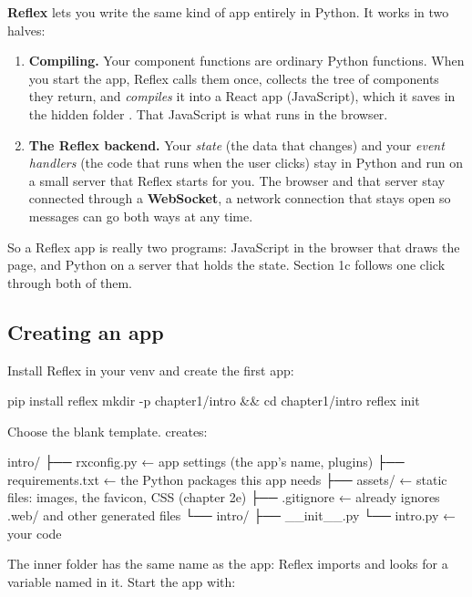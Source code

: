 \textbf{Reflex} lets you write the same kind of app entirely in Python. It works in two halves:

\begin{enumerate}
\item \textbf{Compiling.} Your component functions are ordinary Python functions. When you start the app, Reflex calls them once, collects the tree of components they return, and \emph{compiles} it into a React app (JavaScript), which it saves in the hidden folder . That JavaScript is what runs in the browser.
\item \textbf{The Reflex backend.} Your \emph{state} (the data that changes) and your \emph{event handlers} (the code that runs when the user clicks) stay in Python and run on a small server that Reflex starts for you. The browser and that server stay connected through a \textbf{WebSocket}, a network connection that stays open so messages can go both ways at any time.
\end{enumerate}

So a Reflex app is really two programs: JavaScript in the browser that draws the page, and Python on a server that holds the state. Section 1c follows one click through both of them.

\subsection{Creating an app}

Install Reflex in your venv and create the first app:

\begin{code}
pip install reflex
mkdir -p chapter1/intro && cd chapter1/intro
reflex init
\end{code}

Choose the blank template.  creates:

\begin{code}
intro/
├── rxconfig.py        ← app settings (the app's name, plugins)
├── requirements.txt   ← the Python packages this app needs
├── assets/            ← static files: images, the favicon, CSS (chapter 2e)
├── .gitignore         ← already ignores .web/ and other generated files
└── intro/
    ├── __init__.py
    └── intro.py       ← your code
\end{code}

The inner folder has the same name as the app: Reflex imports  and looks for a variable named  in it. Start the app with:

